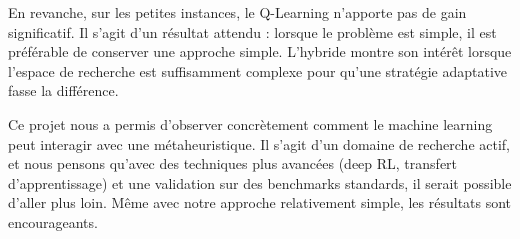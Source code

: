 \documentclass[12pt, a4paper]{article}
\begin{document}
En revanche, sur les petites instances, le Q-Learning n'apporte pas de gain significatif. Il s'agit d'un résultat attendu : lorsque le problème est simple, il est préférable de conserver une approche simple. L'hybride montre son intérêt lorsque l'espace de recherche est suffisamment complexe pour qu'une stratégie adaptative fasse la différence.

Ce projet nous a permis d'observer concrètement comment le machine learning peut interagir avec une métaheuristique. Il s'agit d'un domaine de recherche actif, et nous pensons qu'avec des techniques plus avancées (deep RL, transfert d'apprentissage) et une validation sur des benchmarks standards, il serait possible d'aller plus loin. Même avec notre approche relativement simple, les résultats sont encourageants.
\end{document}
